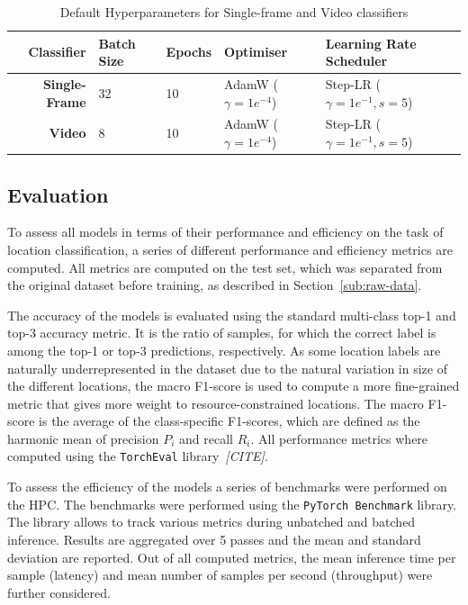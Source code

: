 \documentclass[a4paper]{article}
\begin{document}
\begin{table}[ht]
  \centering
  \begin{tabular}{rllll}
    \toprule
    Classifier & Batch Size & Epochs & Optimiser & Learning Rate Scheduler \\
    \midrule
    \bfseries Single-Frame & 32 & 10 & AdamW ($\gamma=1e^{-4}$) & Step-LR
    ($\gamma=1e^{-1}, s=5$) \\
    \bfseries Video & 8 & 10 & AdamW ($\gamma=1e^{-4}$) & Step-LR
    ($\gamma=1e^{-1}, s=5$) \\
    \bottomrule
  \end{tabular}
  \caption{Default Hyperparameters for Single-frame and Video classifiers}
  \label{tab:default-hyperparams}
\end{table}


\subsection{Evaluation} %
\label{sub:evaluation}

To assess all models in terms of their performance and efficiency on the task
of location classification, a series of different performance and efficiency
metrics are computed. All metrics are computed on the test set, which was
separated from the original dataset before training, as described in
Section~\ref{sub:raw-data}.

The accuracy of the models is evaluated using the standard multi-class top-1
and top-3 accuracy metric. It is the ratio of samples, for which the correct
label is among the top-1 or top-3 predictions, respectively. As some location
labels are naturally underrepresented in the dataset due to the natural
variation in size of the different locations, the macro F1-score is used to
compute a more fine-grained metric that gives more weight to
resource-constrained locations. The macro F1-score is the average of the
class-specific F1-scores, which are defined as the harmonic mean of precision
$P_i$ and recall $R_i$. All performance metrics where computed using the
\texttt{TorchEval} library~\textit{[CITE]}.

To assess the efficiency of the models a series of benchmarks were performed
on the HPC. The benchmarks were performed using the \texttt{PyTorch Benchmark}
library. The library allows to track various metrics during unbatched and
batched inference. Results are aggregated over 5 passes and the mean and
standard deviation are reported. Out of all computed metrics, the mean
inference time per sample (latency) and mean number of samples per second
(throughput) were further considered.
\end{document}
